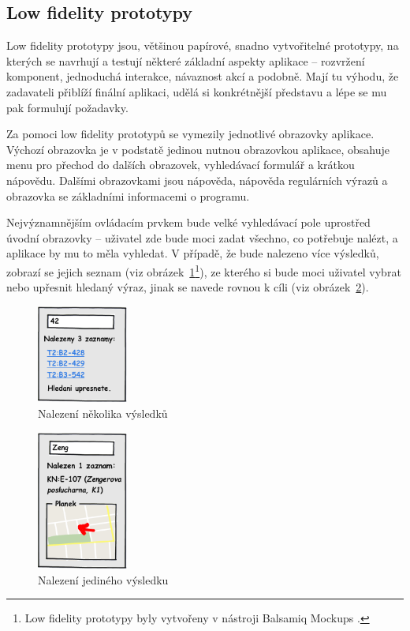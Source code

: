 \subsection{Low fidelity prototypy}
Low fidelity prototypy jsou, většinou papírové, snadno vytvořitelné prototypy, na kterých se navrhují a testují některé základní aspekty aplikace -- rozvržení komponent, jednoduchá interakce, návaznost akcí a podobně. Mají tu výhodu, že zadavateli přiblíží finální aplikaci, udělá si konkrétnější představu a lépe se mu pak formulují požadavky.

Za pomoci low fidelity prototypů se vymezily jednotlivé obrazovky aplikace. Výchozí obrazovka je v podstatě jedinou nutnou obrazovkou aplikace, obsahuje menu pro přechod do dalších obrazovek, vyhledávací formulář a krátkou nápovědu. Dalšími obrazovkami jsou nápověda, nápověda regulárních výrazů a obrazovka se základními informacemi o programu.

Nejvýznamnějším ovládacím prvkem bude velké vyhledávací pole uprostřed úvodní obrazovky -- uživatel zde bude moci zadat všechno, co potřebuje nalézt, a aplikace by mu to měla vyhledat. V případě, že bude nalezeno více výsledků, zobrazí se jejich seznam (viz obrázek~\ref{fig:LFviceVysledku}\footnote{Low fidelity prototypy byly vytvořeny v nástroji Balsamiq Mockups \cite{BalsamiqMockups}.}), ze kterého si bude moci uživatel vybrat nebo upřesnit hledaný výraz, jinak se navede rovnou k cíli (viz obrázek~\ref{fig:LFjedinyVysledek}).

\begin{figure}[ht]
\begin{center}
\includegraphics[width=30mm]{figures/LFviceVysledku}
\caption{Nalezení několika výsledků}
\label{fig:LFviceVysledku}
\end{center}
\end{figure}

\begin{figure}[ht]
\begin{center}
\includegraphics[width=30mm]{figures/LFjedinyVysledek}
\caption{Nalezení jediného výsledku}
\label{fig:LFjedinyVysledek}
\end{center}
\end{figure}

